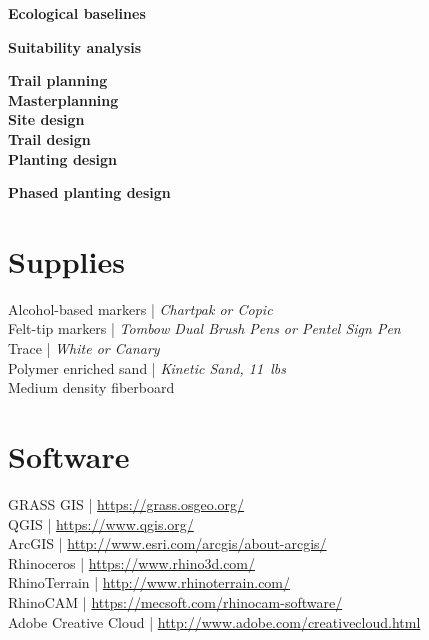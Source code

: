 \documentclass[11pt,article,oneside]{memoir}
\begin{document}
\noindent \textbf{Ecological baselines}
\\
%
\nocite{*} \printbibliography[keyword=baselines, heading=none]
\vspace*{0.5em}

\noindent \textbf{Suitability analysis}
%
\nocite{*} \printbibliography[keyword=suitability, heading=none]
\vspace*{0.5em}

\noindent \textbf{Trail planning}
\\

\noindent \textbf{Masterplanning}
\\

\noindent \textbf{Site design}
\\

\noindent \textbf{Trail design}
\\

\noindent \textbf{Planting design}
%
% 
\nocite{*} \printbibliography[keyword=planting, heading=none]
\vspace*{0.5em}

\noindent \textbf{Phased planting design}
\\

\clearpage

\section{Supplies}
Alcohol-based markers | \emph{Chartpak or Copic}\\
Felt-tip markers | \emph{Tombow Dual Brush Pens or Pentel Sign Pen}\\
Trace | \emph{White or Canary}\\
Polymer enriched sand | \emph{Kinetic Sand, 11~lbs}\\
Medium density fiberboard \\

\section{Software}
GRASS GIS | \url{https://grass.osgeo.org/}\\
QGIS | \url{https://www.qgis.org/}\\
ArcGIS | \url{http://www.esri.com/arcgis/about-arcgis/}\\
Rhinoceros | \url{https://www.rhino3d.com/}\\
RhinoTerrain | \url{http://www.rhinoterrain.com/}\\
RhinoCAM | \url{https://mecsoft.com/rhinocam-software/}\\
Adobe Creative Cloud | \url{http://www.adobe.com/creativecloud.html}\\
\end{document}
